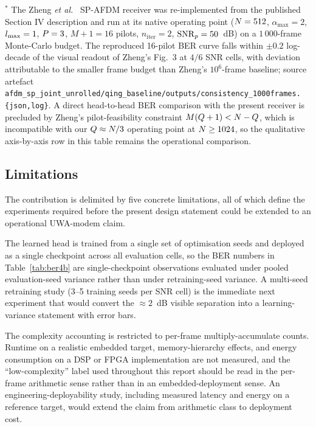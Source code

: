 $^{*}$ The Zheng \emph{et al.}~\cite{qing2024spafdm} SP-AFDM receiver was re-implemented from the published Section IV description and run at its native operating point ($N = 512$, $\alpha_\text{max} = 2$, $l_{\max} = 1$, $P = 3$, $M + 1 = 16$ pilots, $n_\text{iter} = 2$, $\mathrm{SNR}_p = 50$~dB) on a $1\,000$-frame Monte-Carlo budget. The reproduced 16-pilot BER curve falls within $\pm 0.2$ log-decade of the visual readout of Zheng's Fig.~3 at $4/6$ SNR cells, with deviation attributable to the smaller frame budget than Zheng's $10^6$-frame baseline; source artefact \texttt{afdm\_sp\_joint\_unrolled/qing\_baseline/outputs/consistency\_1000frames.\{json,log\}}. A direct head-to-head BER comparison with the present receiver is precluded by Zheng's pilot-feasibility constraint $M(Q+1) < N - Q$, which is incompatible with our $Q \approx N/3$ operating point at $N \geq 1024$, so the qualitative axis-by-axis row in this table remains the operational comparison.

\subsection{Limitations}
\label{ssec:weaknesses}

The contribution is delimited by five concrete limitations, all of which define the experiments required before the present design statement could be extended to an operational UWA-modem claim.

The learned head is trained from a single set of optimisation seeds and deployed as a single checkpoint across all evaluation cells, so the BER numbers in Table~\ref{tab:ber4b} are single-checkpoint observations evaluated under pooled evaluation-seed variance rather than under retraining-seed variance. A multi-seed retraining study (3--5 training seeds per SNR cell) is the immediate next experiment that would convert the $\approx 2$~dB visible separation into a learning-variance statement with error bars.

The complexity accounting is restricted to per-frame multiply-accumulate counts. Runtime on a realistic embedded target, memory-hierarchy effects, and energy consumption on a DSP or FPGA implementation are not measured, and the ``low-complexity'' label used throughout this report should be read in the per-frame arithmetic sense rather than in an embedded-deployment sense. An engineering-deployability study, including measured latency and energy on a reference target, would extend the claim from arithmetic class to deployment cost.

